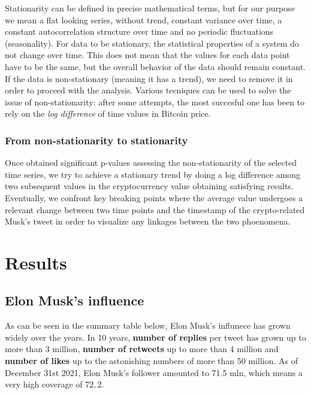 \documentclass[
]{article}
\begin{document}
Stationarity can be defined in precise mathematical terms, but for our
purpose we mean a flat looking series, without trend, constant variance
over time, a constant autocorrelation structure over time and no
periodic fluctuations (seasonality). For data to be stationary, the
statistical properties of a system do not change over time. This does
not mean that the values for each data point have to be the same, but
the overall behavior of the data should remain constant. If the data is
non-stationary (meaning it has a trend), we need to remove it in order
to proceed with the analysis. Various tecniques can be used to solve the
issue of non-stationarity: after some attempts, the most succesful one
has been to rely on the \emph{log difference} of time values in Bitcoin
price.

\hypertarget{from-non-stationarity-to-stationarity}{%
\subsubsection{From non-stationarity to
stationarity}\label{from-non-stationarity-to-stationarity}}

Once obtained significant p-values assessing the non-stationarity of the
selected time series, we try to achieve a stationary trend by doing a
log difference among two subsequent values in the cryptocurrency value
obtaining satisfying results. Eventually, we confront key breaking
points where the average value undergoes a relevant change between two
time points and the timestamp of the crypto-related Musk's tweet in
order to visualize any linkages between the two phoenomena.

\hypertarget{results}{%
\section{Results}\label{results}}

\hypertarget{elon-musks-influence}{%
\subsection{Elon Musk's influence}\label{elon-musks-influence}}

As can be seen in the summary table below, Elon Musk's influnece has
grown widely over the years. In 10 years, \textbf{number of replies} per
tweet has grown up to more than 3 million, \textbf{number of retweets}
up to more than 4 million and \textbf{number of likes} up to the
astonishing numbers of more than 50 million. As of December 31st 2021,
Elon Musk's follower amounted to 71.5 mln, which means a very high
coverage of \(72,2%
\).
\end{document}
